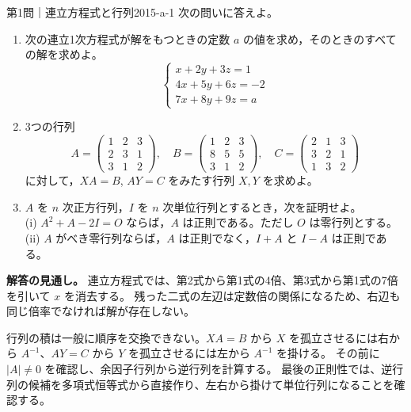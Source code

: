 \begin{problem}{第1問｜連立方程式と行列}{2015-a-1}
次の問いに答えよ。
\begin{enumerate}
  \item[(1)] 次の連立1次方程式が解をもつときの定数 $a$ の値を求め，そのときのすべての解を求めよ。
  \[
  \begin{cases}
  x+2y+3z=1\\
  4x+5y+6z=-2\\
  7x+8y+9z=a
  \end{cases}
  \]
  \item[(2)] 3つの行列
  \[
  A=\begin{pmatrix}1&2&3\\2&3&1\\3&1&2\end{pmatrix},\quad
  B=\begin{pmatrix}1&2&3\\8&5&5\\3&1&2\end{pmatrix},\quad
  C=\begin{pmatrix}2&1&3\\3&2&1\\1&3&2\end{pmatrix}
  \]
  に対して，$XA=B$, $AY=C$ をみたす行列 $X,Y$ を求めよ。
  \item[(3)] $A$ を $n$ 次正方行列，$I$ を $n$ 次単位行列とするとき，次を証明せよ。\\
  (i) $A^2+A-2I=O$ ならば，$A$ は正則である。ただし $O$ は零行列とする。\\
  (ii) $A$ がべき零行列ならば，$A$ は正則でなく，$I+A$ と $I-A$ は正則である。
\end{enumerate}
\end{problem}
\begin{memo*}
\textbf{解答の見通し。}
連立方程式では、第2式から第1式の4倍、第3式から第1式の7倍を引いて $x$ を消去する。
残った二式の左辺は定数倍の関係になるため、右辺も同じ倍率でなければ解が存在しない。

行列の積は一般に順序を交換できない。$XA=B$ から $X$ を孤立させるには右から
$A^{-1}$、$AY=C$ から $Y$ を孤立させるには左から $A^{-1}$ を掛ける。
その前に $|A|\ne0$ を確認し、余因子行列から逆行列を計算する。
最後の正則性では、逆行列の候補を多項式恒等式から直接作り、左右から掛けて単位行列になることを確認する。
\end{memo*}
